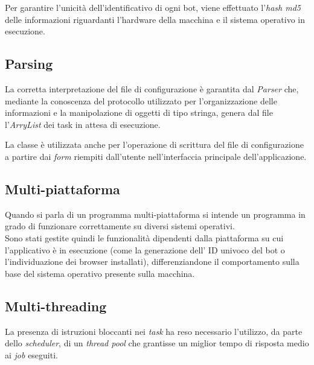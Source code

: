Per garantire l'unicit\`{a} dell'identificativo di ogni bot, viene effettuato l'\textit{hash md5} delle informazioni riguardanti l'hardware della macchina e il sistema operativo in esecuzione.

\vspace*{0.5cm}
\subsection{Parsing}
La corretta interpretazione del file di configurazione \`{e} garantita dal \textit{Parser} che, mediante la conoscenza del protocollo utilizzato per l'organizzazione delle informazioni e la manipolazione di oggetti di tipo stringa, genera dal file l'\textit{ArryList} dei task in attesa di esecuzione. 

La classe \`{e} utilizzata anche per l'operazione di scrittura del file di configurazione a partire dai \textit{form} riempiti dall'utente nell'interfaccia principale dell'applicazione.

\vspace*{0.5cm}
\subsection{Multi-piattaforma}
Quando si parla di un programma multi-piattaforma si intende un programma in grado di funzionare correttamente su diversi sistemi operativi.\\
Sono stati gestite quindi le funzionalit\`{a} dipendenti dalla piattaforma su cui l'applicativo \`{e} in esecuzione (come la generazione dell' ID univoco del bot o l'individuazione dei browser installati), differenziandone il comportamento sulla base del sistema operativo presente sulla macchina.

\vspace*{0.5cm}
\subsection{Multi-threading}
La presenza di istruzioni bloccanti nei \textit{task} ha reso necessario l'utilizzo, da parte dello \textit{scheduler}, di un \textit{thread pool} che grantisse un miglior tempo di risposta medio ai \textit{job} eseguiti.

\vspace*{0.5cm}
